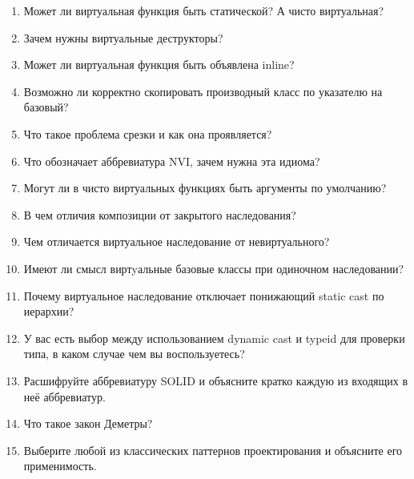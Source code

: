 \documentclass[a4paper,12pt,oneside]{article}
\begin{document}
\begin{enumerate}
\item Может ли виртуальная функция быть статической? А чисто виртуальная?
\item Зачем нужны виртуальные деструкторы?
\item Может ли виртуальная функция быть объявлена inline?
\item Возможно ли корректно скопировать производный класс по указателю на базовый?
\item Что такое проблема срезки и как она проявляется?
\item Что обозначает аббревиатура NVI, зачем нужна эта идиома?
\item Могут ли в чисто виртуальных функциях быть аргументы по умолчанию?
\item В чем отличия композиции от закрытого наследования?
\item Чем отличается виртуальное наследование от невиртуального?
\item Имеют ли смысл виртyальные базовые классы при одиночном наследовании?
\item Почему виртуальное наследование отключает понижающий static cast по иерархии?
\item У вас есть выбор между использованием dynamic cast и typeid для проверки типа, в каком случае чем вы воспользуетесь?
\item Расшифруйте аббревиатуру SOLID и объясните кратко каждую из входящих в неё аббревиатур.
\item Что такое закон Деметры?
\item Выберите любой из классических паттернов проектирования и объясните его применимость.


\end{enumerate}
\end{document}
